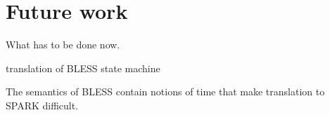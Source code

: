 
\cleardoublepage


\chapter{Future work}
\label{future_work}

What has to be done now.

translation of BLESS state machine

The semantics of BLESS contain notions of time that make translation to SPARK difficult.